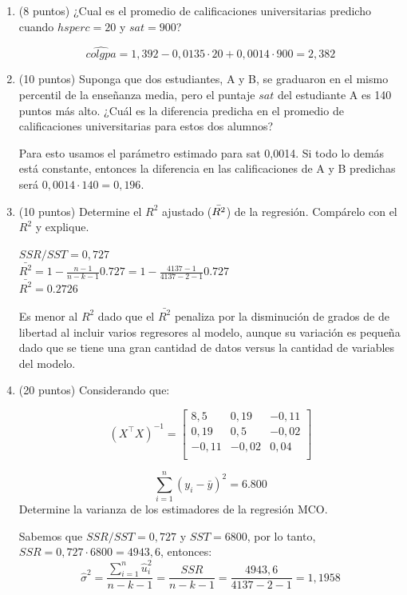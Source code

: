 \documentclass[10pt,a4paper]{article}
\begin{document}
\begin{enumerate}
\begin{enumerate}
{\color{blue} Un valor  bajo en $hsperc$, implica que el estudiante obtuvo alguno de los mejores resultados de su clase. Se espera que los mejores estudiantes del colegio, también tengan buenas calificaciones en la universidad.  }
\item  (8 puntos) ¿Cual es el promedio de calificaciones universitarias predicho cuando $hsperc= 20$ y $sat=900$?

{\color{blue} $$\hat{colgpa} =1,392 -0,0135 \cdot 20 + 0,0014 \cdot 900=2,382$$}


\item (10 puntos) Suponga que dos estudiantes, A y B, se graduaron en el mismo percentil de la enseñanza media, pero el puntaje $sat$ del estudiante A es 140 puntos más alto. ¿Cuál es la diferencia predicha en el promedio
de calificaciones universitarias para estos dos alumnos? 

{\color{blue} Para esto usamos el parámetro estimado para sat 0,0014. Si todo lo demás está constante, entonces la diferencia en las calificaciones de A y B predichas será $0,0014\cdot 140=0,196$.}

\item (10 puntos) Determine el $R^2$ ajustado ($\Bar{R^2}$) de la regresión. Compárelo con el $R^2$ y explique.

{\color{blue}
$SSR/SST=	0,727$\\
$\bar{R^2}=1-\frac{n-1}{n-k-1}0.727=1-\frac{4137-1}{4137-2-1}0.727$\\
$\bar{R^2}=0.2726$

Es menor al $R^2$ dado que el $\bar{R^2}$ penaliza por la disminución de grados de de libertad al incluir varios regresores al modelo, aunque su variación es pequeña dado que se tiene una gran cantidad de datos versus la cantidad de variables del modelo.}

\item (20 puntos) Considerando que:

\[(X^\top X)^{-1} =
\begin{bmatrix}
8,5 & 0,19 & -0,11 \\
0,19 & 0,5 & -0,02 \\
-0,11 & -0,02 & 0,04 \\
\end{bmatrix}
\]

$$ \sum_{i=1}^{n} (y_i - \bar{y})^2=6.800$$
Determine la varianza de los estimadores de la regresión MCO.

{\color{blue} 
Sabemos que $SSR/SST = 0,727$ y $SST=6800$, por lo tanto, $SSR = 0,727\cdot 6800=4943,6 $, entonces:
$$\hat{\sigma}^2 = \frac{\sum_{i=1}^{n} \hat{u}_i^2 }{n-k-1}= \frac{SSR}{n - k - 1}=\frac{4943,6}{4137-2-1}=1,1958$$
    
}
\end{enumerate}
\end{enumerate}
\end{document}
